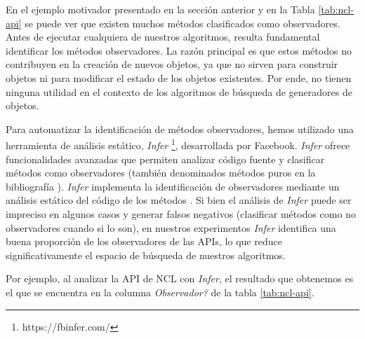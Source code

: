 En el ejemplo motivador presentado en la sección anterior y en la Tabla \ref{tab:ncl-api} se puede ver que existen muchos métodos clasificados como observadores. 
Antes de ejecutar cualquiera de nuestros algoritmos, resulta fundamental identificar los métodos observadores. La razón principal es que estos métodos no contribuyen en la creación de nuevos objetos, ya que no sirven para construir objetos ni para modificar el estado de los objetos existentes. Por ende, no tienen ninguna utilidad en el contexto de los algoritmos de búsqueda de generadores de objetos.

Para automatizar la identificación de métodos observadores, hemos utilizado una herramienta de análisis estático, \emph{Infer} \footnote{https://fbinfer.com/}, 
desarrollada por Facebook. \emph{Infer} ofrece funcionalidades avanzadas que permiten analizar código fuente y clasificar métodos como observadores \cite{Huang:2012} (también denominados métodos puros en la bibliografía \cite{Huang:2012}).
\emph{Infer} implementa la identificación de observadores mediante un análisis estático del código de los métodos \cite{Huang:2012,Salcianu:2005}. 
Si bien el análisis de \emph{Infer} puede ser impreciso en algunos casos y generar falsos negativos (clasificar métodos como no observadores cuando si lo son), 
en nuestros experimentos \emph{Infer}  identifica una buena proporción de los observadores de las APIs, lo que reduce significativamente el espacio de búsqueda de nuestros algoritmos.



Por ejemplo, al analizar la API de NCL con \emph{Infer}, el resultado que
obtenemos es el que se encuentra en la columna \emph{Observador?} de la tabla
\ref{tab:ncl-api}.   

